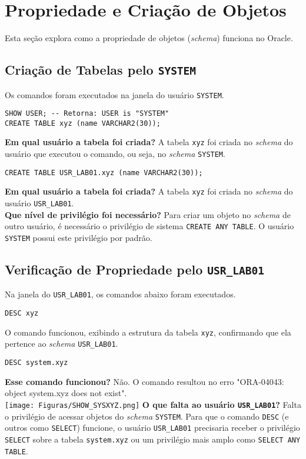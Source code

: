 \documentclass[a4paper, 12pt]{article}
\begin{document}
\section{Propriedade e Criação de Objetos}
Esta seção explora como a propriedade de objetos (\textit{schema}) funciona no Oracle.

\subsection{Criação de Tabelas pelo \texttt{SYSTEM}}
Os comandos foram executados na janela do usuário \texttt{SYSTEM}.
\begin{lstlisting}
SHOW USER; -- Retorna: USER is "SYSTEM"
CREATE TABLE xyz (name VARCHAR2(30));
\end{lstlisting}
\textbf{Em qual usuário a tabela foi criada?} A tabela \texttt{xyz} foi criada no \textit{schema} do usuário que executou o comando, ou seja, no \textit{schema} \texttt{SYSTEM}.

\begin{lstlisting}
CREATE TABLE USR_LAB01.xyz (name VARCHAR2(30));
\end{lstlisting}
\textbf{Em qual usuário a tabela foi criada?} A tabela \texttt{xyz} foi criada no \textit{schema} do usuário \texttt{USR\_LAB01}.\\
\textbf{Que nível de privilégio foi necessário?} Para criar um objeto no \textit{schema} de outro usuário, é necessário o privilégio de sistema \texttt{CREATE ANY TABLE}. O usuário \texttt{SYSTEM} possui este privilégio por padrão.

\subsection{Verificação de Propriedade pelo \texttt{USR\_LAB01}}
Na janela do \texttt{USR\_LAB01}, os comandos abaixo foram executados.
\begin{lstlisting}
DESC xyz
\end{lstlisting}
O comando funcionou, exibindo a estrutura da tabela \texttt{xyz}, confirmando que ela pertence ao \textit{schema} \texttt{USR\_LAB01}.

\begin{lstlisting}
DESC system.xyz
\end{lstlisting}
\textbf{Esse comando funcionou?} Não. O comando resultou no erro "ORA-04043: object system.xyz does not exist".\\
\texttt{[image: Figuras/SHOW\_SYSXYZ.png]}
\textbf{O que falta ao usuário \texttt{USR\_LAB01}?} Falta o privilégio de acessar objetos do \textit{schema} \texttt{SYSTEM}. Para que o comando \texttt{DESC} (e outros como \texttt{SELECT}) funcione, o usuário \texttt{USR\_LAB01} precisaria receber o privilégio \texttt{SELECT} sobre a tabela \texttt{system.xyz} ou um privilégio mais amplo como \texttt{SELECT ANY TABLE}.
\end{document}
